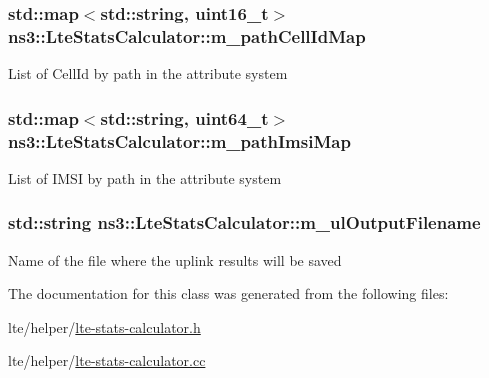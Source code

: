 \subsubsection[{\texorpdfstring{m\+\_\+path\+Cell\+Id\+Map}{m_pathCellIdMap}}]{\setlength{\rightskip}{0pt plus 5cm}std\+::map$<$std\+::string, uint16\+\_\+t$>$ ns3\+::\+Lte\+Stats\+Calculator\+::m\+\_\+path\+Cell\+Id\+Map\hspace{0.3cm}{\ttfamily [private]}}\hypertarget{classns3_1_1LteStatsCalculator_a49a9eed5331eccb0fb9f3a9ca40b711a}{}\label{classns3_1_1LteStatsCalculator_a49a9eed5331eccb0fb9f3a9ca40b711a}
List of Cell\+Id by path in the attribute system 
\subsubsection[{\texorpdfstring{m\+\_\+path\+Imsi\+Map}{m_pathImsiMap}}]{\setlength{\rightskip}{0pt plus 5cm}std\+::map$<$std\+::string, uint64\+\_\+t$>$ ns3\+::\+Lte\+Stats\+Calculator\+::m\+\_\+path\+Imsi\+Map\hspace{0.3cm}{\ttfamily [private]}}\hypertarget{classns3_1_1LteStatsCalculator_a46229dd42330bc89b679200b8a9c3c7f}{}\label{classns3_1_1LteStatsCalculator_a46229dd42330bc89b679200b8a9c3c7f}
List of I\+M\+SI by path in the attribute system 
\subsubsection[{\texorpdfstring{m\+\_\+ul\+Output\+Filename}{m_ulOutputFilename}}]{\setlength{\rightskip}{0pt plus 5cm}std\+::string ns3\+::\+Lte\+Stats\+Calculator\+::m\+\_\+ul\+Output\+Filename\hspace{0.3cm}{\ttfamily [private]}}\hypertarget{classns3_1_1LteStatsCalculator_a0dfb9acc5375b2ca0c880dd395adb80e}{}\label{classns3_1_1LteStatsCalculator_a0dfb9acc5375b2ca0c880dd395adb80e}
Name of the file where the uplink results will be saved 

The documentation for this class was generated from the following files\+:\begin{DoxyCompactItemize}
\item 
lte/helper/\hyperlink{lte-stats-calculator_8h}{lte-\/stats-\/calculator.\+h}\item 
lte/helper/\hyperlink{lte-stats-calculator_8cc}{lte-\/stats-\/calculator.\+cc}\end{DoxyCompactItemize}
